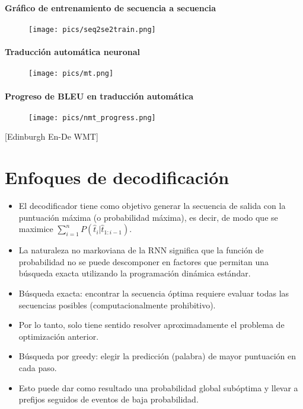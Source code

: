 \paragraph{Gráfico de entrenamiento de secuencia a secuencia}
         \begin{figure}[h]
        	\texttt{[image: pics/seq2se2train.png]}
        \end{figure}





\paragraph{Traducción automática neuronal}
         \begin{figure}[h]
        	\texttt{[image: pics/mt.png]}
        \end{figure}

\paragraph{Progreso de BLEU en traducción automática}
         \begin{figure}[h]
        	\texttt{[image: pics/nmt\_progress.png]}
        \end{figure}
[Edinburgh En-De WMT]


\section{Enfoques de decodificación}
\begin{itemize}
\item El decodificador tiene como objetivo generar la secuencia de salida con la puntuación máxima (o probabilidad máxima), es decir, de modo que se maximice $\sum_{i=1}^{n}P(\hat{t}_i | \hat{t}_{1:i-1})$.
\item La naturaleza no markoviana de la RNN significa que la función de probabilidad no se puede descomponer en factores que permitan una búsqueda exacta utilizando la programación dinámica estándar.
\item Búsqueda exacta: encontrar la secuencia óptima requiere evaluar todas las secuencias posibles (computacionalmente prohibitivo).
\item Por lo tanto, solo tiene sentido resolver aproximadamente el problema de optimización anterior.
\item Búsqueda por greedy: elegir la predicción (palabra) de mayor puntuación en cada paso.
\item Esto puede dar como resultado una probabilidad global subóptima y llevar a prefijos seguidos de eventos de baja probabilidad.
\end{itemize}



